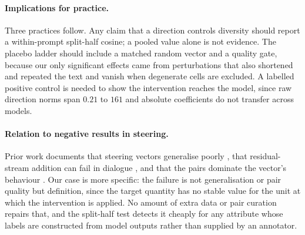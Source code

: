 \paragraph{Implications for practice.}
Three practices follow. Any claim that a direction controls diversity should report a within-prompt
split-half cosine; a pooled value alone is not evidence. The placebo ladder should include a matched
random vector and a quality gate, because our only significant effects came from perturbations that
also shortened and repeated the text and vanish when degenerate cells are excluded. A labelled
positive control is needed to show the intervention reaches the model, since raw direction norms
span $0.21$ to $161$ and absolute coefficients do not transfer across models.

\paragraph{Relation to negative results in steering.}
Prior work documents that steering vectors generalise poorly \citep{tan2024analyzing}, that
residual-stream addition can fail in dialogue \citep{kang2026promptactivation}, and that the pairs
dominate the vector's behaviour \citep{bohek2026detecting,hao2025patterns}. Our case is more
specific: the failure is not generalisation or pair quality but definition, since the target
quantity has no stable value for the unit at which the intervention is applied. No amount of extra
data or pair curation repairs that, and the split-half test detects it cheaply for any attribute
whose labels are constructed from model outputs rather than supplied by an annotator.
